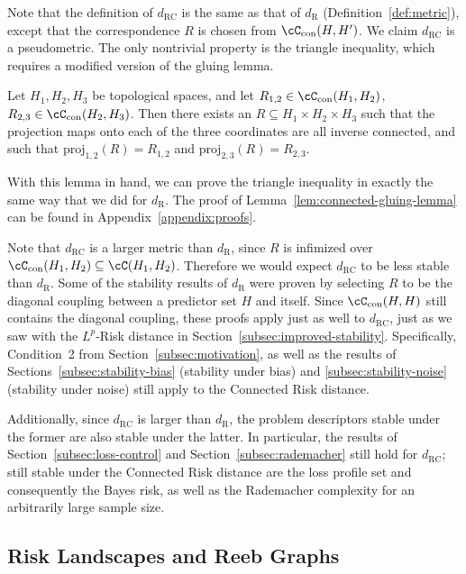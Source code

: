 \documentclass[twoside,11pt]{article}
\newcommand{\op}[1]{\operatorname{#1}}
\newcommand{\dexp}[1][]{d_{\mathrm{R}#1}}
\newcommand{\dexpcon}[1][]{d_{\operatorname{RC}#1}}
\newcommand{\con}{\cC_{\mathrm{con}}}%
\begin{document}
    Note that the definition of $\dexpcon$ is the same as that of $\dexp$ (Definition~\ref{def:metric}), except that the correspondence $R$ is chosen from $\con(H,H')$.
    We claim $\dexpcon$ is a pseudometric. The only nontrivial property is the triangle inequality, which requires a modified version of the gluing lemma.
    \begin{lemma}\label{lem:connected-gluing-lemma}
        Let $H_1,H_2,H_3$ be topological spaces, and let $R_{1,2}\in \con(H_1,H_2)$, $R_{2,3}\in \con(H_2,H_3)$. Then there exists an $R \subseteq H_1\times H_2 \times H_3$ such that the projection maps onto each of the three coordinates are all inverse connected, and such that $\op{proj_{1,2}}(R) = R_{1,2}$ and  $\op{proj_{2,3}}(R) = R_{2,3}$.
    \end{lemma}
    With this lemma in hand, we can prove the triangle inequality in exactly the same way that we did for $\dexp$.
    The proof of Lemma~\ref{lem:connected-gluing-lemma} can be found in Appendix~\ref{appendix:proofs}.

    \begin{remark}\label{rem:dexpcon-inherited-results}
    Note that $\dexpcon$ is a larger metric than $\dexp$, since $R$ is infimized over $\con(H_1,H_2)\subseteq \cC(H_1,H_2)$. Therefore we would expect $\dexpcon$ to be less stable than $\dexp$. Some of the stability results of $\dexp$ were proven by selecting $R$ to be the diagonal coupling between a predictor set $H$ and itself. Since $\con(H,H)$ still contains the diagonal coupling, these proofs apply just as well to $\dexpcon$, just as we saw with the $L^p$-Risk distance in Section~\ref{subsec:improved-stability}. Specifically, Condition~2 from Section~\ref{subsec:motivation}, as well as the results of Sections~\ref{subsec:stability-bias} (stability under bias) and \ref{subsec:stability-noise} (stability under noise) still apply to the Connected Risk distance.
    \end{remark}


    Additionally, since $\dexpcon$ is larger than $\dexp$, the problem descriptors stable under the former are also stable under the latter. In particular, the results of Section~\ref{subsec:loss-control} and Section~\ref{subsec:rademacher}
    still hold for $\dexpcon$; still stable under the Connected Risk distance are the loss profile set and consequently the Bayes risk, as well as the Rademacher complexity for an arbitrarily large sample size.

\subsection{Risk Landscapes and Reeb Graphs} 
\end{document}
